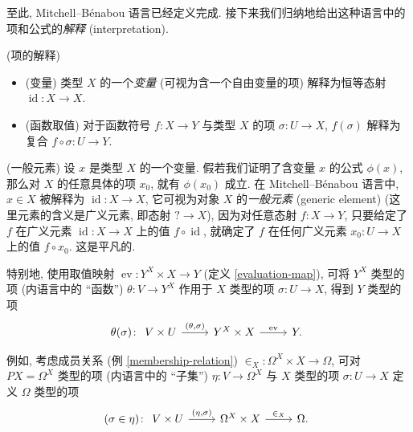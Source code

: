 至此, Mitchell--B\'enabou 语言已经定义完成. 接下来我们归纳地给出这种语言中的项和公式的\emph{解释} (interpretation).

%    


%	


\begin{definition}
	{(项的解释)}
	\begin{itemize}
		\item (变量)
		类型 $X$ 的一个\emph{变量} (可视为含一个自由变量的项) 解释为恒等态射 $\operatorname{id}\colon X \to X$.
		\item (函数取值)
		对于函数符号 $f\colon X \to Y$ 与类型 $X$ 的项 $\sigma\colon U \to X$, $f(\sigma)$ 解释为复合 $f\circ\sigma \colon U \to Y$.
	\end{itemize}
\end{definition}

\begin{remark}
	{(一般元素)}
	设 $x$ 是类型 $X$ 的一个变量.
	假若我们证明了含变量 $x$ 的公式 $\phi(x)$,
	那么对 $X$ 的任意具体的项 $x_0$, 就有 $\phi(x_0)$ 成立.
	在 Mitchell--B\'enabou 语言中, $x\in X$ 被解释为 $\operatorname{id}\colon X\to X$, 它可视为对象 $X$ 的\emph{一般元素} (generic element) (这里元素的含义是广义元素, 即态射 $?\to X$), 因为对任意态射 $f\colon X\to Y$, 只要给定了 $f$ 在广义元素 $\operatorname{id}\colon X\to X$ 上的值 $f\circ\operatorname{id}$, 就确定了 $f$ 在任何广义元素 $x_0\colon U\to X$ 上的值 $f\circ x_0$. 这是平凡的.
\end{remark}

特别地, 使用取值映射 $\operatorname{ev}\colon Y^X\times X\to Y$ (定义 \ref{evaluation-map}),
可将 $Y^X$ 类型的项 (内语言中的 ``函数'') $\theta\colon V\to Y^X$
作用于 $X$ 类型的项 $\sigma \colon U \to X$,
得到 $Y$ 类型的项
\[\theta(\sigma)\colon
\begin{tikzcd}[ampersand replacement=\&]
	{V\times U} \& {Y^X\times X} \& Y.
	\arrow["{(\theta,\sigma)}", from=1-1, to=1-2]
	\arrow["{\operatorname{ev}}", from=1-2, to=1-3]
\end{tikzcd}\]

例如, 考虑成员关系 (例 \ref{membership-relation}) ${\in_X} \colon \Omega^X\times X \to \Omega$,
可对 $PX=\Omega^X$ 类型的项 (内语言中的 ``子集'') $\eta\colon V \to \Omega^X$ 与 $X$ 类型的项 $\sigma\colon U\to X$ 定义 $\Omega$ 类型的项
\[
(\sigma \in \eta) \colon 
\begin{tikzcd}[ampersand replacement=\&]
	{V\times U} \& {\Omega^X\times X} \& \Omega.
	\arrow["{(\eta,\sigma)}", from=1-1, to=1-2]
	\arrow["{\in_X}", from=1-2, to=1-3]
\end{tikzcd}\]

